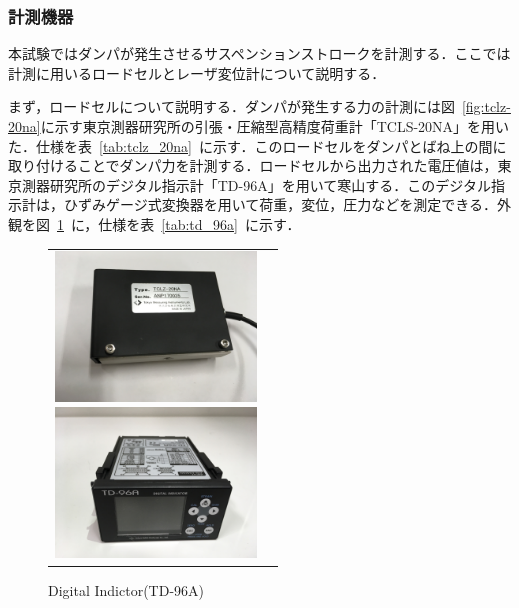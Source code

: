 \documentclass[a4paper,12pt]{article_vdlab_sotsuron}
\begin{document}
\newpage
\subsubsection{計測機器}
本試験ではダンパが発生させるサスペンションストロークを計測する．ここでは計測に用いるロードセルとレーザ変位計について説明する．

まず，ロードセルについて説明する．ダンパが発生する力の計測には図~\ref{fig:tclz-20na}に示す東京測器研究所の引張・圧縮型高精度荷重計「TCLS-20NA」を用いた．仕様を表~\ref{tab:tclz_20na}~に示す．このロードセルをダンパとばね上の間に取り付けることでダンパ力を計測する．ロードセルから出力された電圧値は，東京測器研究所のデジタル指示計「TD-96A」を用いて寒山する．このデジタル指示計は，ひずみゲージ式変換器を用いて荷重，変位，圧力などを測定できる．外観を図~\ref{fig:td_96a}~に，仕様を表~\ref{tab:td_96a}~に示す．


\vspace*{10mm}
\begin{figure}[h!]
  \begin{tabular}{cc}
  \begin{minipage}{0.5\hsize}
  \begin{center}
    \includegraphics[height=40mm]{figure/tclz_20na.eps}
      \vspace*{3mm}
      \caption{Loadcell(TCLZ-20NA)}
      \label{fig:tclz-20na}
    \end{center}
  \end{minipage}
  \begin{minipage}{0.5\hsize}
     \begin{center}
      \includegraphics[height=40mm]{figure/td_96a.eps}
      \vspace*{3mm}
      \caption{Digital Indictor(TD-96A)}
      \label{fig:td_96a}
    \end{center}
  \end{minipage}
  \end{tabular}
 \end{figure}
\end{document}
